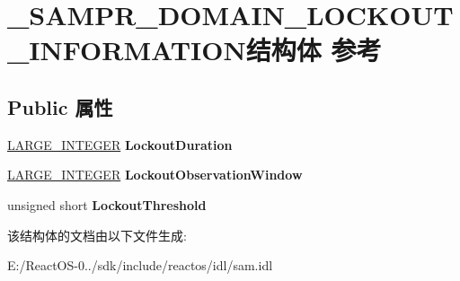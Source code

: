 \hypertarget{struct___s_a_m_p_r___d_o_m_a_i_n___l_o_c_k_o_u_t___i_n_f_o_r_m_a_t_i_o_n}{}\section{\+\_\+\+S\+A\+M\+P\+R\+\_\+\+D\+O\+M\+A\+I\+N\+\_\+\+L\+O\+C\+K\+O\+U\+T\+\_\+\+I\+N\+F\+O\+R\+M\+A\+T\+I\+O\+N结构体 参考}
\label{struct___s_a_m_p_r___d_o_m_a_i_n___l_o_c_k_o_u_t___i_n_f_o_r_m_a_t_i_o_n}
\subsection*{Public 属性}
\begin{DoxyCompactItemize}
\item 
\mbox{\label{struct___s_a_m_p_r___d_o_m_a_i_n___l_o_c_k_o_u_t___i_n_f_o_r_m_a_t_i_o_n_a0f1cd136b206716fb5ff9c15d788cd3b}} 
\hyperlink{union___l_a_r_g_e___i_n_t_e_g_e_r}{L\+A\+R\+G\+E\+\_\+\+I\+N\+T\+E\+G\+ER} {\bfseries Lockout\+Duration}
\item 
\mbox{\label{struct___s_a_m_p_r___d_o_m_a_i_n___l_o_c_k_o_u_t___i_n_f_o_r_m_a_t_i_o_n_a9586be910875715631d336f291614b8b}} 
\hyperlink{union___l_a_r_g_e___i_n_t_e_g_e_r}{L\+A\+R\+G\+E\+\_\+\+I\+N\+T\+E\+G\+ER} {\bfseries Lockout\+Observation\+Window}
\item 
\mbox{\label{struct___s_a_m_p_r___d_o_m_a_i_n___l_o_c_k_o_u_t___i_n_f_o_r_m_a_t_i_o_n_a20c2ab1cea6eb8e3ff0805e66ec8496f}} 
unsigned short {\bfseries Lockout\+Threshold}
\end{DoxyCompactItemize}


该结构体的文档由以下文件生成\+:\begin{DoxyCompactItemize}
\item 
E\+:/\+React\+O\+S-\/0../sdk/include/reactos/idl/sam.\+idl\end{DoxyCompactItemize}

